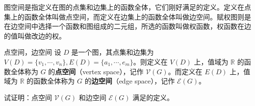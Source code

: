 
图空间是指定义在图的点集和边集上的函数全体，它们刚好满足的定义。定义在点集上的函数全体叫做点空间，而定义在边集上的函数全体叫做边空间。赋权图则是在边空间中选择一个函数和图组成的二元组，所选的函数叫做权函数，权函数在边的值叫做改边的权。

\begin{definition}{点空间，边空间}
设 $D$ 是一个图，其点集和边集为 $V(D)=\{v_1,\cdots,v_n\},E(D)=\{a_1,\cdots,e_m\}$。则定义在 $V(D)$ 上，值域为 $\mathbb R$ 的函数全体称为 $G$ 的\textbf{点空间}（vertex space），记作 $\mathcal V(G)$。而定义在 $E(D)$ 上，值域为 $\mathbb R$ 的函数全体称为 $G$ 的\textbf{边空间}（edge space），记作 $\mathcal E(G)$。
\end{definition}


\begin{exercise}{}
试证明：点空间 $\mathcal V(G)$ 和边空间 $\mathcal E(G)$ 满足的定义。
\end{exercise}










